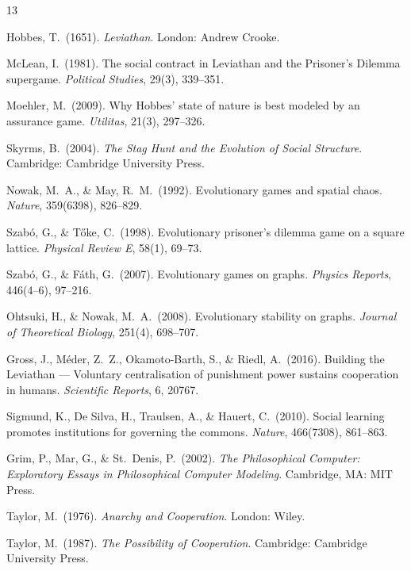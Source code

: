 \documentclass[12pt,a4paper]{ctexart}
\begin{document}
\begin{thebibliography}{13}

Hobbes, T.\ (1651). \textit{Leviathan}. London: Andrew Crooke.

McLean, I.\ (1981). The social contract in Leviathan and the Prisoner's Dilemma supergame. \textit{Political Studies}, 29(3), 339--351.

Moehler, M.\ (2009). Why Hobbes' state of nature is best modeled by an assurance game. \textit{Utilitas}, 21(3), 297--326.

Skyrms, B.\ (2004). \textit{The Stag Hunt and the Evolution of Social Structure}. Cambridge: Cambridge University Press.

Nowak, M.\ A., \& May, R.\ M.\ (1992). Evolutionary games and spatial chaos. \textit{Nature}, 359(6398), 826--829.

Szab\'{o}, G., \& T\H{o}ke, C.\ (1998). Evolutionary prisoner's dilemma game on a square lattice. \textit{Physical Review E}, 58(1), 69--73.

Szab\'{o}, G., \& F\'{a}th, G.\ (2007). Evolutionary games on graphs. \textit{Physics Reports}, 446(4--6), 97--216.

Ohtsuki, H., \& Nowak, M.\ A.\ (2008). Evolutionary stability on graphs. \textit{Journal of Theoretical Biology}, 251(4), 698--707.

Gross, J., M\'{e}der, Z.\ Z., Okamoto-Barth, S., \& Riedl, A.\ (2016). Building the Leviathan — Voluntary centralisation of punishment power sustains cooperation in humans. \textit{Scientific Reports}, 6, 20767.

Sigmund, K., De Silva, H., Traulsen, A., \& Hauert, C.\ (2010). Social learning promotes institutions for governing the commons. \textit{Nature}, 466(7308), 861--863.

Grim, P., Mar, G., \& St.\ Denis, P.\ (2002). \textit{The Philosophical Computer: Exploratory Essays in Philosophical Computer Modeling}. Cambridge, MA: MIT Press.

Taylor, M.\ (1976). \textit{Anarchy and Cooperation}. London: Wiley.

Taylor, M.\ (1987). \textit{The Possibility of Cooperation}. Cambridge: Cambridge University Press.

\end{thebibliography}
\end{document}

